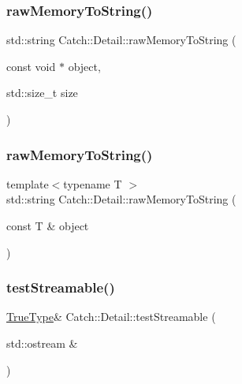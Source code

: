 \mbox{\label{namespace_catch_1_1_detail_ac5d6c510e565ee5bddcc2236194ce29e}} 
\subsubsection{\texorpdfstring{raw\+Memory\+To\+String()}{rawMemoryToString()}\hspace{0.1cm}{\footnotesize\ttfamily [1/2]}}
{\footnotesize\ttfamily std\+::string Catch\+::\+Detail\+::raw\+Memory\+To\+String (\begin{DoxyParamCaption}\item[{const void $\ast$}]{object,  }\item[{std\+::size\+\_\+t}]{size }\end{DoxyParamCaption})}

\mbox{\label{namespace_catch_1_1_detail_a371620ed524abfcae5c3772bf49b563a}} 
\subsubsection{\texorpdfstring{raw\+Memory\+To\+String()}{rawMemoryToString()}\hspace{0.1cm}{\footnotesize\ttfamily [2/2]}}
{\footnotesize\ttfamily template$<$typename T $>$ \\
std\+::string Catch\+::\+Detail\+::raw\+Memory\+To\+String (\begin{DoxyParamCaption}\item[{const T \&}]{object }\end{DoxyParamCaption})\hspace{0.3cm}{\ttfamily [inline]}}

\mbox{\label{namespace_catch_1_1_detail_aff0ca0f561ad8053654ab27d54486197}} 
\subsubsection{\texorpdfstring{test\+Streamable()}{testStreamable()}\hspace{0.1cm}{\footnotesize\ttfamily [1/2]}}
{\footnotesize\ttfamily \mbox{\hyperlink{struct_catch_1_1_detail_1_1_true_type}{True\+Type}}\& Catch\+::\+Detail\+::test\+Streamable (\begin{DoxyParamCaption}\item[{std\+::ostream \&}]{ }\end{DoxyParamCaption})}

